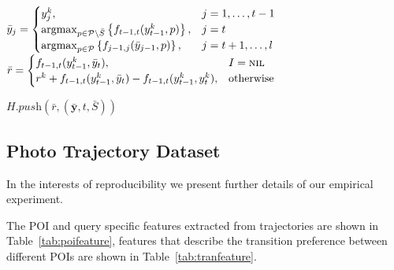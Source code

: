 \begin{algorithm}[htbp]
\begin{algorithmic}[1]
        \STATE $\bar{y}_j = \begin{cases}
                            y_j^k,& j=1,\dots,t-1 \\
                            \operatorname*{argmax}_{p \in \mathcal{P} \setminus \bar{S}} \left\{ f_{t-1,t}(y_{t-1}^k, p) \right\},& j=t \\
                            \operatorname*{argmax}_{p \in \mathcal{P}} \left\{ f_{j-1, j}(\bar{y}_{j-1}, p) \right\},& j=t+1,\dots,l
                \end{cases}$
        \STATE $\bar{r} = \begin{cases}
                          f_{t-1,t}(y_{t-1}^k, \bar{y}_t),&I = \textsc{nil} \\
                          r^k + f_{t-1,t}(y_{t-1}^k, \bar{y}_t) - f_{t-1,t}(y_{t-1}^k, y_t^k), &\text{otherwise}
                          \end{cases}$

        $H.\textit{push}\left(\bar{r}, (\bar{\mathbf{y}}, t, \bar{S}) \right)$
    \ENDFOR
\ENDWHILE
\end{algorithmic}
\end{algorithm}

\clearpage
\subsection{Photo Trajectory Dataset}
\label{sec:feature}

In the interests of reproducibility we present further details of our empirical experiment.

The POI and query specific features extracted from trajectories are shown in Table~\ref{tab:poifeature},
features that describe the transition preference between different POIs are shown in Table~\ref{tab:tranfeature}.

